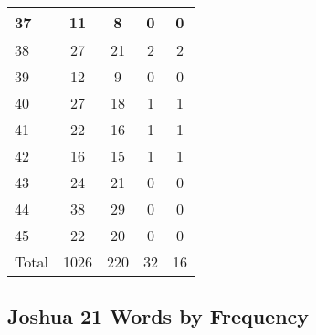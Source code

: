 \begin{center}
\begin{longtable}{l|c|c|c|c}
37 & 11 & 8 & 0 & 0\\ \hline
38 & 27 & 21 & 2 & 2\\ \hline
39 & 12 & 9 & 0 & 0\\ \hline
40 & 27 & 18 & 1 & 1\\ \hline
41 & 22 & 16 & 1 & 1\\ \hline
42 & 16 & 15 & 1 & 1\\ \hline
43 & 24 & 21 & 0 & 0\\ \hline
44 & 38 & 29 & 0 & 0\\ \hline
45 & 22 & 20 & 0 & 0\\ \hline
Total & 1026 & 220 & 32 & 16
\end{longtable}
\end{center}





\subsection{Joshua 21 Words by Frequency}


\normalsize
 
